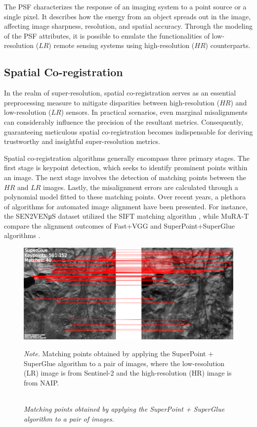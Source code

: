 The PSF characterizes the response of an imaging system to a point source or a single pixel. It describes how the energy from an object spreads out in the image, affecting image sharpness, resolution, and spatial accuracy. Through the modeling of the PSF attributes, it is possible to emulate the functionalities of low-resolution ($LR$) remote sensing systems using high-resolution ($HR$) counterparts.

\subsection{Spatial Co-registration}

In the realm of super-resolution, spatial co-registration serves as an essential preprocessing measure to mitigate disparities between high-resolution ($HR$) and low-resolution ($LR$) sensors. In practical scenarios, even marginal misalignments can considerably influence the precision of the resultant metrics. Consequently, guaranteeing meticulous spatial co-registration becomes indispensable for deriving trustworthy and insightful super-resolution metrics.

Spatial co-registration algorithms generally encompass three primary stages. The first stage is keypoint detection, which seeks to identify prominent points within an image. The next stage involves the detection of matching points between the $HR$ and $LR$ images. Lastly, the misalignment errors are calculated through a polynomial model fitted to these matching points. Over recent years, a plethora of algorithms for automated image alignment have been presented. For instance, the SEN2VENμS dataset utilized the SIFT matching algorithm \autocite{michel2022sen2venmus}, while MuRA-T compare the alignment outcomes of Fast+VGG and SuperPoint+SuperGlue algorithms \autocite{deshmukh2023aligned}.

\begin{figure}[H]
    \caption{\doublespacing \\ \textit{Matching points obtained by applying the SuperPoint + SuperGlue algorithm to a pair of images.}} 
    \centering
    \includegraphics[width=1\linewidth]{images/csaybar_fig01.png}
    \begin{justify}
        \textit{Note.} Matching points obtained by applying the SuperPoint + SuperGlue algorithm to a pair of images, where the low-resolution (LR) image is from Sentinel-2 and the high-resolution (HR) image is from NAIP.
    \end{justify}                    
    \label{fig:coregistration}
\end{figure}

